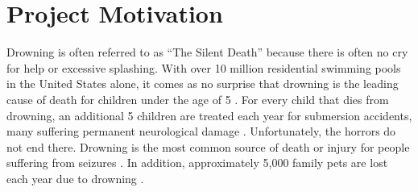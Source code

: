 \section{Project Motivation}

Drowning is often referred to as ``The Silent Death'' because there is often no cry for help or excessive splashing. With over 10 million residential swimming pools in the United States alone, it comes as no surprise that drowning is the leading cause of death for children under the age of 5 \cite{drowning}. For every child that dies from drowning, an additional 5 children are treated each year for submersion accidents, many suffering permanent neurological damage \cite{unintentional drowning}. Unfortunately, the horrors do not end there. Drowning is the most common source of death or injury for people suffering from seizures \cite{unintentional drowning}. In addition, approximately 5,000 family pets are lost each year due to drowning \cite{pets}. 

